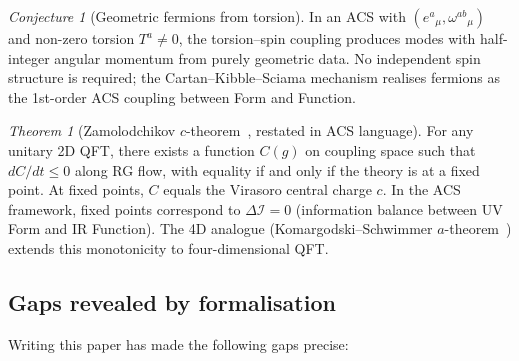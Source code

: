 \documentclass[12pt,a4paper]{article}
\theoremstyle{plain}
\theoremstyle{definition}
\theoremstyle{remark}
\newtheorem*{theorem*}{Theorem}
\newtheorem{conjecture}[theorem]{Conjecture}
\newcommand{\DI}{\Delta\mathcal{I}}
\begin{document}
\begin{conjecture}[Geometric fermions from torsion]\label{conj:fermions}
In an ACS with $(e^a{}_\mu, \omega^{ab}{}_\mu)$ and non-zero torsion 
$T^a \neq 0$, the torsion--spin coupling produces modes with half-integer 
angular momentum from purely geometric data.  No independent spin structure 
is required; the Cartan--Kibble--Sciama mechanism realises fermions as the 
1st-order ACS coupling between Form and Function.
\end{conjecture}

\begin{theorem*}[Zamolodchikov $c$-theorem~\cite{Zamolodchikov1986}, restated in ACS language]\label{thm:c-theorem}
For any unitary 2D QFT, there exists a function $C(g)$ on coupling space such that $dC/dt \leq 0$ along RG flow, with equality if and only if the theory is at a fixed point.  At fixed points, $C$ equals the Virasoro central charge $c$.  In the ACS framework, fixed points correspond to $\DI = 0$ (information balance between UV Form and IR Function).  The 4D analogue (Komargodski--Schwimmer $a$-theorem~\cite{KomargodskiSchwimmer2011}) extends this monotonicity to four-dimensional QFT.
\end{theorem*}

\subsection{Gaps revealed by formalisation}

Writing this paper has made the following gaps precise:
\end{document}
